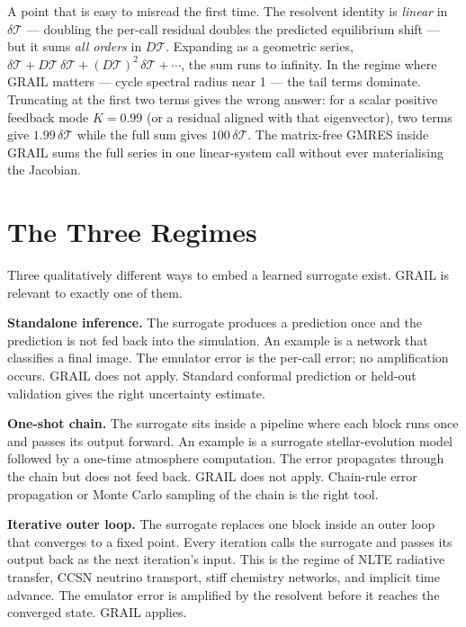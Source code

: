 A point that is easy to misread the first time.
The resolvent identity is \emph{linear} in $\delta\mathcal{T}$ ---
doubling the per-call residual doubles the predicted equilibrium shift ---
but it sums \emph{all orders} in $D\mathcal{T}$.
Expanding as a geometric series,
$\delta\mathcal{T} + D\mathcal{T}\,\delta\mathcal{T}
 + (D\mathcal{T})^2\,\delta\mathcal{T} + \cdots$,
the sum runs to infinity.
In the regime where GRAIL matters --- cycle spectral radius near 1 ---
the tail terms dominate.
Truncating at the first two terms gives the wrong answer:
for a scalar positive feedback mode $K=0.99$ (or a residual aligned with
that eigenvector), two terms give $1.99\,\delta\mathcal{T}$
while the full sum gives $100\,\delta\mathcal{T}$.
The matrix-free GMRES inside GRAIL sums the full series in one
linear-system call without ever materialising the Jacobian.

\section{The Three Regimes}
\label{sec:three-regimes}

Three qualitatively different ways to embed a learned surrogate exist.
GRAIL is relevant to exactly one of them.

\medskip

\noindent\textbf{Standalone inference.}
The surrogate produces a prediction once and the prediction is not fed
back into the simulation.
An example is a network that classifies a final image.
The emulator error is the per-call error; no amplification occurs.
GRAIL does not apply.
Standard conformal prediction or held-out validation gives the right
uncertainty estimate.

\medskip

\noindent\textbf{One-shot chain.}
The surrogate sits inside a pipeline where each block runs once and passes
its output forward.
An example is a surrogate stellar-evolution model followed by a one-time
atmosphere computation.
The error propagates through the chain but does not feed back.
GRAIL does not apply.
Chain-rule error propagation or Monte Carlo sampling of the chain is the
right tool.

\medskip

\noindent\textbf{Iterative outer loop.}
The surrogate replaces one block inside an outer loop that converges to
a fixed point.
Every iteration calls the surrogate and passes its output back as the
next iteration's input.
This is the regime of NLTE radiative transfer, CCSN neutrino transport,
stiff chemistry networks, and implicit time advance.
The emulator error is amplified by the resolvent before it reaches the
converged state.
GRAIL applies.

